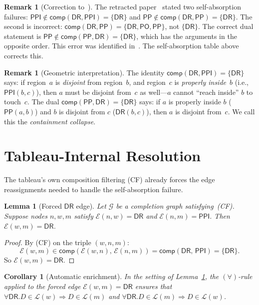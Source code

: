 \documentclass[a4paper,11pt]{article}
\newtheorem{lemma}[theorem]{Lemma}
\newtheorem{corollary}[theorem]{Corollary}
\theoremstyle{definition}
\newtheorem{remark}[theorem]{Remark}
\newcommand{\DR}{\ensuremath{\mathsf{DR}}}
\newcommand{\PO}{\ensuremath{\mathsf{PO}}}
\newcommand{\PP}{\ensuremath{\mathsf{PP}}}
\newcommand{\PPI}{\ensuremath{\mathsf{PPI}}}
\newcommand{\comp}{\ensuremath{\mathsf{comp}}}
\begin{document}
\begin{remark}[Correction to~\cite{ExtensionGapPaper}]
\label{rem:correction}
The retracted paper~\cite{ExtensionGapPaper} stated two self-absorption
failures: $\PPI \notin \comp(\DR, \PPI) = \{\DR\}$ and
$\PP \notin \comp(\DR, \PP) = \{\DR\}$.  The second is incorrect:
$\comp(\DR, \PP) = \{\DR, \PO, \PP\}$, not $\{\DR\}$.  The correct
dual statement is $\PP \notin \comp(\PP, \DR) = \{\DR\}$, which has
the arguments in the opposite order.  This error was identified
in~\cite{GPTReview}.  The self-absorption table above corrects this.
\end{remark}

\begin{remark}[Geometric interpretation]
\label{rem:geometric}
The identity $\comp(\DR, \PPI) = \{\DR\}$ says: if region~$a$ is
\emph{disjoint} from region~$b$, and region~$c$ is \emph{properly
inside}~$b$ (i.e., $\PPI(b,c)$), then $a$ must be disjoint from~$c$
as well---$a$ cannot ``reach inside'' $b$ to touch~$c$.  The
dual $\comp(\PP, \DR) = \{\DR\}$ says: if $a$ is properly inside $b$
($\PP(a,b)$) and $b$ is disjoint from $c$ ($\DR(b,c)$), then $a$ is
disjoint from~$c$.  We call this the \emph{containment collapse}.
\end{remark}


\section{Tableau-Internal Resolution}
\label{sec:tableau-resolution}

The tableau's own composition filtering (CF) already forces the edge
reassignments needed to handle the self-absorption failure.

\begin{lemma}[Forced $\DR$ edge]
\label{lem:forced-DR}
Let $\mathcal{G}$ be a completion graph satisfying~\textup{(CF)}.
Suppose nodes $n, w, m$ satisfy $\mathcal{E}(n, w) = \DR$ and
$\mathcal{E}(n, m) = \PPI$.  Then $\mathcal{E}(w, m) = \DR$.
\end{lemma}

\begin{proof}
By (CF) on the triple $(w, n, m)$:
\[
  \mathcal{E}(w, m) \in \comp(\mathcal{E}(w, n),\, \mathcal{E}(n, m))
  = \comp(\DR,\, \PPI) = \{\DR\}.
\]
So $\mathcal{E}(w, m) = \DR$.
\end{proof}

\begin{corollary}[Automatic enrichment]
\label{cor:enrichment}
In the setting of Lemma~\ref{lem:forced-DR}, the $(\forall)$-rule
applied to the forced edge $\mathcal{E}(w, m) = \DR$ ensures that
$\forall \DR.D \in \mathcal{L}(w) \Rightarrow D \in \mathcal{L}(m)$
and $\forall \DR.D \in \mathcal{L}(m) \Rightarrow D \in \mathcal{L}(w)$.
\end{corollary}
\end{document}
